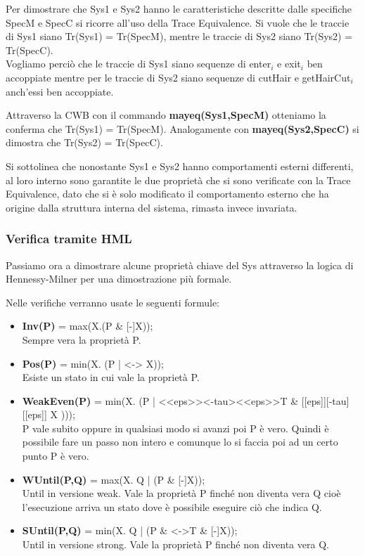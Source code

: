 Per dimostrare che \textsf{Sys1} e \textsf{Sys2} hanno le caratteristiche descritte dalle specifiche \textsf{SpecM} e \textsf{SpecC} si ricorre all'uso della Trace Equivalence. Si vuole che le traccie di \textsf{Sys1} siano\textsf{ Tr(Sys1) = Tr(SpecM)}, mentre le traccie di \textsf{Sys2} siano \textsf{Tr(Sys2) = Tr(SpecC)}. \\
Vogliamo perciò che le traccie di \textsf{Sys1} siano sequenze di \textsf{enter$_{i}$} e \textsf{exit$_{i}$} ben accoppiate mentre per le traccie di \textsf{Sys2} siano sequenze di \textsf{cutHair} e \textsf{getHairCut$_{i}$} anch'essi ben accoppiate.

Attraverso la CWB con il commando \textbf{mayeq(Sys1,SpecM)} otteniamo la conferma che \textsf{Tr(Sys1) = Tr(SpecM)}. Analogamente con \textbf{mayeq(Sys2,SpecC)} si dimostra che \textsf{Tr(Sys2) = Tr(SpecC)}.

Si sottolinea che nonostante \textsf{Sys1} e \textsf{Sys2} hanno comportamenti esterni differenti, al loro interno sono garantite le due proprietà che si sono verificate con la Trace Equivalence, dato che si è solo modificato il comportamento esterno che ha origine dalla struttura interna del sistema, rimasta invece invariata.

\subsubsection{Verifica tramite HML}

Passiamo ora a dimostrare alcune proprietà chiave del \textsf{Sys} attraverso la logica di Hennessy-Milner per una dimostrazione più formale.

Nelle verifiche verranno usate le seguenti formule:
\begin{itemize}
	\item \textbf{Inv(P)} = \textsf{max(X.(P \& [-]X));}\\
	Sempre vera la proprietà P.
	\item \textbf{Pos(P)} = \textsf{min(X. (P | <-> X));}\\
	Esiste un stato in cui vale la proprietà P.
	\item \textbf{WeakEven(P)} = \textsf{min(X. (P | <<eps>><-tau><<eps>>T \& [[eps]][-tau][[eps]] X )));}\\
	P vale subito oppure in qualsiasi modo si avanzi poi P è vero. Quindi è possibile fare un passo non intero e comunque lo si faccia poi ad un certo punto P è vero.
	\item \textbf{WUntil(P,Q)} = \textsf{max(X. Q | (P \& [-]X));}\\
	Until in versione weak. Vale la proprietà P finché non diventa vera Q cioè l'esecuzione arriva un stato dove è possibile eseguire ciò che indica Q.
	\item \textbf{SUntil(P,Q)} = \textsf{min(X. Q | (P \& <->T \& [-]X));}\\
	Until in versione strong. Vale la proprietà P finché non diventa vera Q.
\end{itemize}

